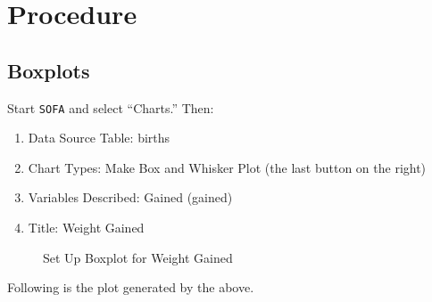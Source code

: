 \section{Procedure}

\subsection{Boxplots}

Start \texttt{SOFA} and select ``Charts.'' Then:

\begin{enumerate}
  \item Data Source Table: births
  \item Chart Types: Make Box and Whisker Plot (the last button on the right)
  \item Variables Described: Gained (gained)
  \item Title: Weight Gained
\end{enumerate}

\begin{figure}[H]
  \begin{center}
    \caption{Set Up Boxplot for Weight Gained}
  \end{center}
\end{figure}

Following is the plot generated by the above.

